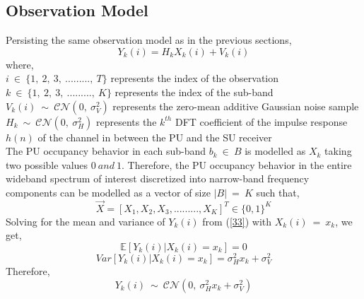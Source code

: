 \documentclass[12pt, draftcls, onecolumn]{IEEEtran}
\begin{document}
\subsection{Observation Model}
Persisting the same observation model as in the previous sections,
\begin{equation}\label{33}
    Y_k(i) = H_kX_k(i) + V_k(i)
\end{equation}
where,
\\$i\ \in\ \{1,\ 2,\ 3,\ .........,\ T\}$ represents the index of the observation
\\$k\ \in\ \{1,\ 2,\ 3,\ .........,\ K\}$ represents the index of the sub-band
\\$V_k(i)\ \sim\ \mathcal{CN}(0,\ \sigma_V^2)$ represents the zero-mean additive Gaussian noise sample
\\$H_k\ \sim\ \mathcal{CN}(0,\ \sigma_H^2)$ represents the $k^{th}$ DFT coefficient of the impulse response $h(n)$ of the channel in between the PU and the SU receiver
\\The PU occupancy behavior in each sub-band $b_k\ \in\ B$ is modelled as $X_k$ taking two possible values $0\ and\ 1$. Therefore, the PU occupancy behavior in the entire wideband spectrum of interest discretized into narrow-band frequency components can be modelled as a vector of size $|B|\ =\ K$ such that,
\begin{equation}\label{34}
    \vec{X} = [X_1, X_2, X_3, ........., X_K]^T \in \{0,1\}^K
\end{equation}
Solving for the mean and variance of $Y_k(i)$ from (\ref{33}) with $X_k(i)\ =\ x_k$, we get,
\begin{equation}\label{35}
    \mathbb E[Y_k(i) | X_k(i) = x_k] = 0
\end{equation}
\begin{equation}\label{36}
    Var[Y_k(i) | X_k(i) = x_k] = \sigma_H^2x_k + \sigma_V^2
\end{equation}
Therefore,
\[Y_k(i)\ \sim\ \mathcal{CN}(0,\ \sigma_H^2x_k + \sigma_V^2)\]
\end{document}
